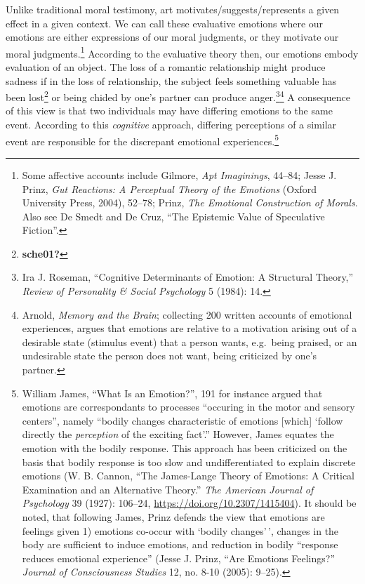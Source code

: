 \documentclass[
  12pt,
]{book}
\theoremstyle{definition}
\theoremstyle{definition}
\theoremstyle{definition}
\theoremstyle{definition}
\theoremstyle{remark}
\begin{document}
Unlike traditional moral testimony, art motivates/suggests/represents a given effect in a given context. We can call these evaluative emotions where our emotions are either expressions of our moral judgments, or they motivate our moral judgments.\footnote{Some affective accounts include Gilmore, \emph{Apt {Imaginings}}, 44--84; Jesse J. Prinz, \emph{Gut {Reactions}: {A Perceptual Theory} of the {Emotions}} (Oxford University Press, 2004), 52--78; Prinz, \emph{The {Emotional Construction} of {Morals}}. Also see De Smedt and De Cruz, {``The Epistemic Value of Speculative Fiction''}.} According to the evaluative theory then, our emotions embody evaluation of an object. The loss of a romantic relationship might produce sadness if in the loss of relationship, the subject feels something valuable has been lost\footnote{\textbf{sche01?}} or being chided by one's partner can produce anger.\footnote{Ira J. Roseman, {``Cognitive Determinants of Emotion: {A} Structural Theory,''} \emph{Review of Personality \& Social Psychology} 5 (1984): 14.}\footnote{Arnold, \emph{Memory and the Brain}; collecting 200 written accounts of emotional experiences, argues that emotions are relative to a motivation arising out of a desirable state (stimulus event) that a person wants, e.g.~being praised, or an undesirable state the person does not want, being criticized by one's partner.} A consequence of this view is that two individuals may have differing emotions to the same event. According to this \emph{cognitive} approach, differing perceptions of a similar event are responsible for the discrepant emotional experiences.\footnote{William James, {``What Is an Emotion?''}, 191 for instance argued that emotions are correspondants to processes ``occuring in the motor and sensory centers'', namely ``bodily changes characteristic of emotions {[}which{]} `follow directly the \emph{perception} of the exciting fact'.'' However, James equates the emotion with the bodily response. This approach has been criticized on the basis that bodily response is too slow and undifferentiated to explain discrete emotions (W. B. Cannon, {``The {James-Lange} Theory of Emotions: A Critical Examination and an Alternative Theory.''} \emph{The American Journal of Psychology} 39 (1927): 106--24, \url{https://doi.org/10.2307/1415404}). It should be noted, that following James, Prinz defends the view that emotions are feelings given 1) emotions co-occur with `bodily changes'\,', changes in the body are sufficient to induce emotions, and reduction in bodily ``response reduces emotional experience'' (Jesse J. Prinz, {``Are Emotions Feelings?''} \emph{Journal of Consciousness Studies} 12, no. 8-10 (2005): 9--25).}
\end{document}
